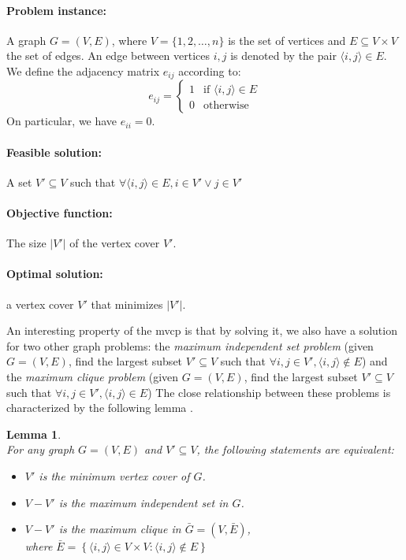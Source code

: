 \documentclass[12pt]{article}
\newtheorem{lemma}{Lemma}
\begin{document}
{
\setlength{\parskip}{0em}
\paragraph{Problem instance:}
A graph $G = (V, E)$, where $V = \{1, 2, \dots, n\}$
is the set of vertices and $E \subseteq V \times V$ the
set of edges.
An edge between vertices $i, j$ is denoted
by the pair $\langle i, j \rangle \in E$.
We define the adjacency matrix $e_{ij}$ according to:
\[
e_{ij} =
\begin{cases}
1 & \text{if } \langle i, j \rangle \in E \\
0 & \text{otherwise}
\end{cases}
\]
On particular, we have $e_{ii} = 0$.

\paragraph{Feasible solution:} A set $V' \subseteq V$ such that
$\forall \langle i, j \rangle \in E, i \in V' \vee j \in V'$
\paragraph{Objective function:} The size $|V'|$ of the vertex cover $V'$.
\paragraph{Optimal solution:} a vertex cover $V'$ that minimizes $|V'|$.
}

An interesting property of the mvcp is that by
solving it, we also have a solution for two other
graph problems: the \textit{maximum independent set problem}
(given $G = (V, E)$, find the largest subset $V' \subseteq V$
such that $\forall i, j \in V', \langle i, j \rangle \notin E$)
and the \textit{maximum clique problem}
(given $G = (V, E)$, find the largest subset $V' \subseteq V$
such that $\forall i, j \in V', \langle i, j \rangle \in E$)
The close relationship between these problems is characterized
by the following lemma \cite{6:misp}.
\begin{lemma}
\ \\[3mm]
For any graph $G = (V, E)$ and $V' \subseteq V$, the following
statements are equivalent:
\begin{itemize}
\vspace{-3mm}
\setlength{\parskip}{0.5em}
\item $V'$ is the minimum vertex cover of $G$.
\item $V - V'$ is the maximum independent set in $G$.
\item $V - V'$ is the maximum clique in $\bar{G} = (V, \bar{E})$,\\[1mm]
where
$\bar{E}=\left\{ \langle i, j \rangle\in V \times V :
\langle i, j \rangle \notin E \right\}$
\end{itemize}
\end{lemma}
\end{document}

